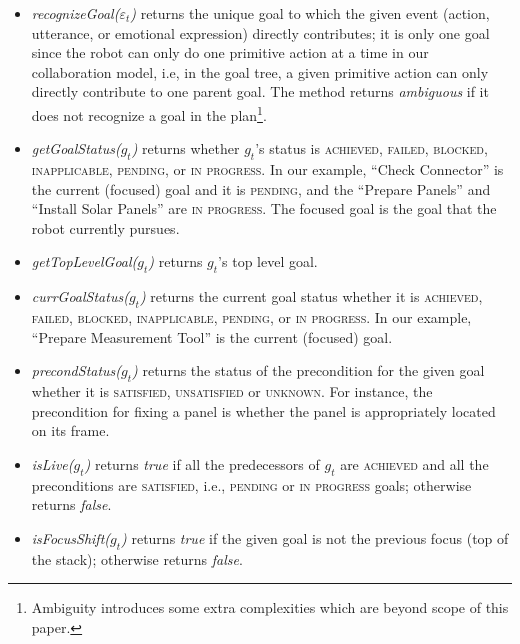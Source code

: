 \begin{itemize}[leftmargin=2pt]
  \item \textit{recognizeGoal($\varepsilon_t$)} returns the unique goal to which
  the given event (action, utterance, or emotional expression) directly
  contributes; it is only one goal since the robot can only do one primitive
  action at a time in our collaboration model, i.e, in the goal tree, a given
  primitive action can only directly contribute to one parent goal. The method
  returns \textit{ambiguous} if it does not recognize a goal in the
  plan\footnote{Ambiguity introduces some extra complexities which are beyond
  scope of this paper.}.
  
  \item \textit{getGoalStatus($g_t$)} returns whether $g_t$'s status is
  \textsc{achieved, failed, blocked, inapplicable, pending,} or \textsc{in
  progress}. In our example, ``Check Connector'' is the current (focused) goal
  and it is \textsc{pending}, and the ``Prepare Panels'' and ``Install Solar
  Panels'' are \textsc{in progress}. The focused goal is the goal that the robot
  currently pursues.
  
  \item \textit{getTopLevelGoal($g_t$)} returns $g_t$'s top level goal.
  
  \item \textit{currGoalStatus($g_t$)} returns the current goal status whether
  it is \textsc{achieved, failed, blocked, inapplicable, pending,} or \textsc{in
  progress}. In our example, ``Prepare Measurement Tool'' is the current
  (focused) goal.

  \item \textit{precondStatus($g_t$)} returns the status of the precondition for
  the given goal whether it is \textsc{satisfied, unsatisfied} or
  \textsc{unknown}. For instance, the precondition for fixing a panel is whether
  the panel is appropriately located on its frame.
  
  \item \textit{isLive($g_t$)} returns \textit{true} if all the predecessors of
  $g_t$ are \textsc{achieved} and all the preconditions are \textsc{satisfied},
  i.e., \textsc{pending} or \textsc{in progress} goals; otherwise returns
  \textit{false}.
  
  \item \textit{isFocusShift($g_t$)} returns \textit{true} if the given
  goal is not the previous focus (top of the stack); otherwise returns
  \textit{false}.
  

\end{itemize}
